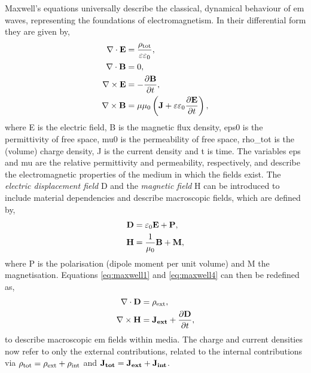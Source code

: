 \documentclass{article}
\begin{document}
Maxwell's equations universally describe the classical, dynamical behaviour of \gls{em} waves, representing the foundations of electromagnetism. In their differential form they are given by,
\begin{subequations}
\begin{align}
	\nabla \cdot \mathbf{E} &= \frac{\rho_{\mathrm{tot}}}{\varepsilon\varepsilon_0}, \label{eq:maxwell1}\\
	\nabla \cdot \mathbf{B} &= 0, \label{eq:maxwell2}\\
	\nabla \times \mathbf{E} &= -\frac{\partial \mathbf{B}}{\partial t}, \label{eq:maxwell3}\\
	\nabla \times \mathbf{B} &= \mu\mu_0 \left( \mathbf{J} + \varepsilon\varepsilon_0 \frac{\partial \mathbf{E}}{\partial t} \right), \label{eq:maxwell4}
\end{align}
\end{subequations}
where \gls{E} is the electric field, \gls{B} is the magnetic flux density, \gls{eps0} is the permittivity of free space, \gls{mu0} is the permeability of free space, \gls{rho_tot} is the (volume) charge density, \gls{J} is the current density and \gls{t} is time. The variables \gls{eps} and \gls{mu} are the relative permittivity and permeability, respectively, and describe the electromagnetic properties of the medium in which the fields exist. The \textit{electric displacement field} \gls{D} and the \textit{magnetic field} \gls{H} can be introduced to include material dependencies and describe macroscopic fields, which are defined by,
\begin{subequations}
\begin{align}
	\mathbf{D} &= \varepsilon_0\mathbf{E} + \mathbf{P}, \label{eq:displacement_field}\\
	\mathbf{H} &= \frac{1}{\mu_0}\mathbf{B} + \mathbf{M}, \label{eq:magnetic_field}
\end{align}
\end{subequations}
where \gls{P} is the polarisation (dipole moment per unit volume) and \gls{M} the magnetisation. Equations \eqref{eq:maxwell1} and \eqref{eq:maxwell4} can then be redefined as,
\begin{subequations}
\begin{align}
	\nabla \cdot \mathbf{D} &= \rho_{\mathrm{ext}}, \label{eq:new_maxwell1}\\
	\nabla \times \mathbf{H} &= \mathbf{J_{ext}} + \frac{\partial \mathbf{D}}{\partial t}, \label{eq:new_maxwell4}
\end{align}
\end{subequations}
to describe macroscopic \gls{em} fields within media. The charge and current densities now refer to only the external contributions, related to the internal contributions via $\rho_{\mathrm{tot}}=\rho_{\mathrm{ext}}+\rho_{\mathrm{int}}$ and $\mathbf{J_{tot}}=\mathbf{J_{ext}}+\mathbf{J_{int}}$.
\end{document}
